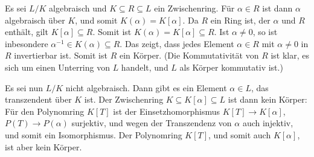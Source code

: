 \begin{solution}
  Es sei $L/K$ algebraisch und $K \subseteq R \subseteq L$ ein Zwischenring.
  Für $\alpha \in R$ ist dann $\alpha$ algebraisch über $K$, und somit $K(\alpha) = K[\alpha]$.
  Da $R$ ein Ring ist, der $\alpha$ und $R$ enthält, gilt $K[\alpha] \subseteq R$.
  Somit ist $K(\alpha) = K[\alpha] \subseteq R$.
  Ist $\alpha \neq 0$, so ist inbesondere $\alpha^{-1} \in K(\alpha) \subseteq R$.
  Das zeigt, dass jedes Element $\alpha \in R$ mit $\alpha \neq 0$ in $R$ invertierbar ist.
  Somit ist $R$ ein Körper.
  (Die Kommutativität von $R$ ist klar, es sich um einen Unterring von $L$ handelt, und $L$ als Körper kommutativ ist.)
  
  Es sei nun $L/K$ nicht algebraisch.
  Dann gibt es ein Element $\alpha \in L$, das transzendent über $K$ ist.
  Der Zwischenring $K \subseteq K[\alpha] \subseteq L$ ist dann kein Körper:
  Für den Polynomring $K[T]$ ist der Einsetzhomorphismus $K[T] \to K[\alpha]$, $P(T) \to P(\alpha)$ surjektiv, und wegen der Transzendenz von $\alpha$ auch injektiv, und somit ein Isomorphismus.
  Der Polynomring $K[T]$, und somit auch $K[\alpha]$, ist aber kein Körper.
\end{solution}




